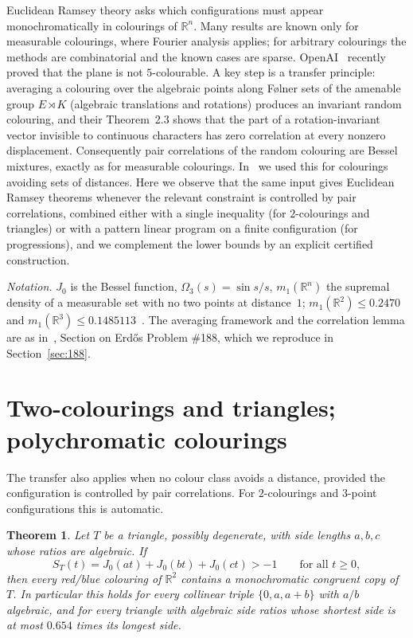 \documentclass[11pt]{amsart}
\newtheorem{theorem}{Theorem}[section]
\theoremstyle{definition}
\newcommand{\R}{\mathbb{R}}
\begin{document}
Euclidean Ramsey theory asks which configurations must appear monochromatically in colourings of $\R^n$. Many results are known only for measurable colourings, where Fourier analysis applies; for arbitrary colourings the methods are combinatorial and the known cases are sparse. OpenAI~\cite{OAI} recently proved that the plane is not $5$-colourable. A key step is a transfer principle: averaging a colouring over the algebraic points along F\o lner sets of the amenable group $E\rtimes K$ (algebraic translations and rotations) produces an invariant random colouring, and their Theorem~2.3 shows that the part of a rotation-invariant vector invisible to continuous characters has zero correlation at every nonzero displacement. Consequently pair correlations of the random colouring are Bessel mixtures, exactly as for measurable colourings. In~\cite{BassR3,BassMono} we used this for colourings avoiding sets of distances. Here we observe that the same input gives Euclidean Ramsey theorems whenever the relevant constraint is controlled by pair correlations, combined either with a single inequality (for $2$-colourings and triangles) or with a pattern linear program on a finite configuration (for progressions), and we complement the lower bounds by an explicit certified construction.

\emph{Notation.} $J_0$ is the Bessel function, $\Omega_3(s)=\sin s/s$, $m_1(\R^n)$ the supremal density of a measurable set with no two points at distance~$1$; $m_1(\R^2)\le0.2470$~\cite{ACMVZ} and $m_1(\R^3)\le0.1485113$~\cite{BassR3}. The averaging framework and the correlation lemma are as in~\cite{BassMono}, Section on Erd\H{o}s Problem \#188, which we reproduce in Section~\ref{sec:188}.

\section{Two-colourings and triangles; polychromatic colourings}\label{sec:twocol}

The transfer also applies when no colour class avoids a distance, provided the configuration is controlled by pair correlations. For $2$-colourings and $3$-point configurations this is automatic.

\begin{theorem}\label{thm:tri}
Let $T$ be a triangle, possibly degenerate, with side lengths $a,b,c$ whose ratios are algebraic. If
\[
S_T(t)=J_0(at)+J_0(bt)+J_0(ct)>-1\qquad\text{for all }t\ge0,
\]
then every red/blue colouring of $\R^2$ contains a monochromatic congruent copy of $T$. In particular this holds for every collinear triple $\{0,a,a+b\}$ with $a/b$ algebraic, and for every triangle with algebraic side ratios whose shortest side is at most $0.654$ times its longest side.
\end{theorem}
\end{document}
